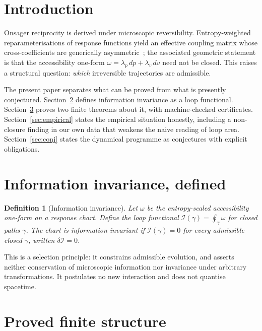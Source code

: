 \documentclass[aps,prd,twocolumn,superscriptaddress,nofootinbib]{revtex4-2}
\newcommand{\cI}{\mathcal{I}}
\newtheorem{definition}{Definition}
\begin{document}
\maketitle

\section{Introduction}

Onsager reciprocity is derived under microscopic reversibility. Entropy-weighted
reparameterisations of response functions yield an effective coupling matrix
whose cross-coefficients are generically asymmetric~\cite{Dabas2026}; the
associated geometric statement is that the accessibility one-form
$\omega=\lambda_p\,dp+\lambda_v\,dv$ need not be closed. This raises a
structural question: \emph{which} irreversible trajectories are admissible.

The present paper separates what can be proved from what is presently
conjectured. Section~\ref{sec:def} defines information invariance as a loop
functional. Section~\ref{sec:proved} proves two finite theorems about it, with
machine-checked certificates. Section~\ref{sec:empirical} states the empirical
situation honestly, including a non-closure finding in our own data that
weakens the naive reading of loop area. Section~\ref{sec:conj} states the
dynamical programme as conjectures with explicit obligations.

\section{Information invariance, defined}\label{sec:def}

\begin{definition}[Information invariance]\label{def:ii}
Let $\omega$ be the entropy-scaled accessibility one-form on a response chart.
Define the loop functional $\cI(\gamma)=\oint_\gamma\omega$ for closed paths
$\gamma$. The chart is \emph{information invariant} if $\cI(\gamma)=0$ for every
admissible closed $\gamma$, written $\delta\cI=0$.
\end{definition}

This is a selection principle: it constrains admissible evolution, and asserts
neither conservation of microscopic information nor invariance under arbitrary
transformations. It postulates no new interaction and does not quantise
spacetime.

\section{Proved finite structure}\label{sec:proved}
\end{document}
